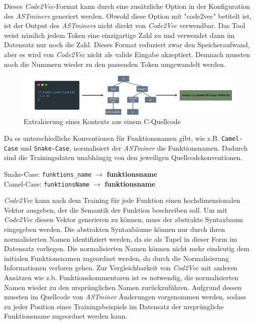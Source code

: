 \documentclass[12pt,letterpaper,ngerman]{article}
\begin{document}
Dieses \textit{Code2Vec}-Format kann durch eine zusätzliche Option in der
Konfiguration des \textit{ASTminers} generiert werden. Obwohl diese Option 
mit "code2vec" betitelt ist, ist der Output des \textit{ASTminers} nicht direkt 
von \textit{Code2Vec} verwendbar. Das Tool weist nämlich jedem Token eine
einzigartige Zahl zu und verwendet dann im Datensatz nur noch die Zahl.
Dieses Format reduziert zwar den Speicheraufwand, aber es wird von 
\textit{Code2Vec} nicht als valide Eingabe akzeptiert. Demnach mussten noch die 
Nummern wieder zu den passenden Token umgewandelt werden.
\begin{figure}[H]
  \begin{center}
    \includegraphics[scale=0.2]{abb/ast-extraction-example.drawio.png}
  \end{center}
  \caption{Extrahierung eines Kontexts aus einem C-Quellcode}
\end{figure}
Da es unterschiedliche Konventionen für Funktionsnamen gibt, wie z.B.
\verb|Camel-Case| und \verb|Snake-Case|, normalisiert der \textit{ASTminer} 
die Funktionsnamen. Dadurch sind die Trainingsdaten unabhängig von den
jeweiligen Quellcodekonventionen.
\begin{example}
  \hfill
  \begin{center}
    Snake-Case: \verb|funktions_name| $\to$ {\bf funktions\text{\textbar}name }\\
    Camel-Case: \verb|funktionsName| $\to$ {\bf funktions\text{\textbar}name}
  \end{center}
\end{example}
\textit{Code2Vec} kann nach dem Training für jede Funktion einen hochdimensionalen
Vektor ausgeben, der die Semantik der Funktion beschreiben soll.
Um mit \textit{Code2Vec} diesen Vektor generieren zu können, muss der abstrakte 
Syntaxbaum eingegeben werden. Die abstrakten Syntaxbäume können nur durch 
ihren normalisierten Namen identifiziert werden, da sie als Tupel in dieser 
Form im Datensatz vorliegen. Die normalisierten Namen können nicht mehr 
eindeutig dem initialen Funktionsnamen zugeordnet werden, da durch die 
Normalisierung Informationen verloren gehen. Zur Vergleichbarkeit von 
\textit{Cod2Vec} mit anderen Ansätzen wie z.b. Funktionskommentaren ist es notwendig,
die normalisierten Namen wieder zu den ursprünglichen Namen zurückzuführen.
Aufgrund dessen mussten im Quellcode von \textit{ASTminer} Änderungen vorgenommen 
werden, sodass zu jeder Position eines Trainingsbeispiels im Datensatz der 
ursprüngliche Funktionsname zugeordnet werden kann. 
\end{document}
